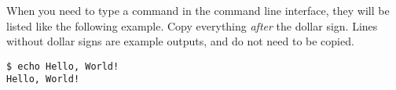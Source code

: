 When you need to type a command in the command line interface, they will be listed like the following example. Copy everything \textit{after} the dollar sign. Lines without dollar signs are example outputs, and do not need to be copied.
			
\begin{lstlisting}[style=Terminal]
$ echo Hello, World!
Hello, World!
\end{lstlisting}